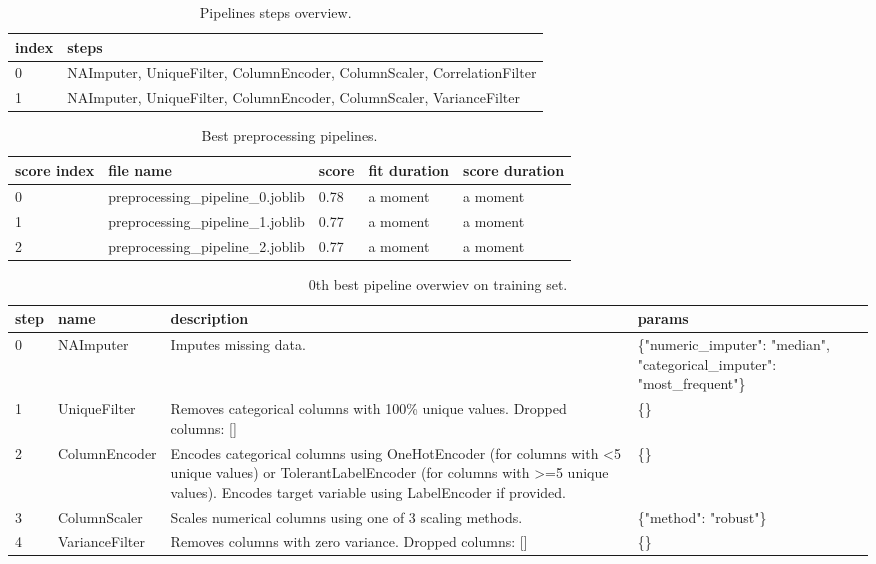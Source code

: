 \documentclass{article}%
\begin{document}
%


\begin{table}[H]%
\begin{center}%
\begin{tabular}{p{20mm} p{160mm}}%
\hline%
\textbf{index}&\textbf{steps}\\%
\hline%
0&NAImputer, UniqueFilter, ColumnEncoder, ColumnScaler, CorrelationFilter\\%
1&NAImputer, UniqueFilter, ColumnEncoder, ColumnScaler, VarianceFilter\\%
\hline%
\end{tabular}%
\end{center}%
\caption{Pipelines steps overview.}%
\end{table}

%


\begin{table}[H]%
\begin{center}%
\begin{tabular}{l l l l l}%
\hline%
\textbf{score index}&\textbf{file name}&\textbf{score}&\textbf{fit duration}&\textbf{score duration}\\%
\hline%
0&preprocessing\_pipeline\_0.joblib&0.78&a moment&a moment\\%
1&preprocessing\_pipeline\_1.joblib&0.77&a moment&a moment\\%
2&preprocessing\_pipeline\_2.joblib&0.77&a moment&a moment\\%
\hline%
\end{tabular}%
\end{center}%
\caption{Best preprocessing pipelines.}%
\end{table}

%


\begin{table}[H]%
\begin{center}%
\begin{tabular}{p{10mm} p{30mm} p{60mm} p{60mm}}%
\hline%
\textbf{step}&\textbf{name}&\textbf{description}&\textbf{params}\\%
\hline%
0&NAImputer&Imputes missing data.&\{"numeric\_imputer": "median", "categorical\_imputer": "most\_frequent"\}\\%
1&UniqueFilter&Removes categorical columns with 100\% unique values. Dropped columns: {[}{]}&\{\}\\%
2&ColumnEncoder&Encodes categorical columns using OneHotEncoder (for columns with <5 unique values) or TolerantLabelEncoder (for columns with >=5 unique values). Encodes target variable using LabelEncoder if provided.&\{\}\\%
3&ColumnScaler&Scales numerical columns using one of 3 scaling methods.&\{"method": "robust"\}\\%
4&VarianceFilter&Removes columns with zero variance. Dropped columns: {[}{]}&\{\}\\%
\hline%
\end{tabular}%
\end{center}%
\caption{0th best pipeline overwiev on training set.}%
\end{table}
\end{document}

